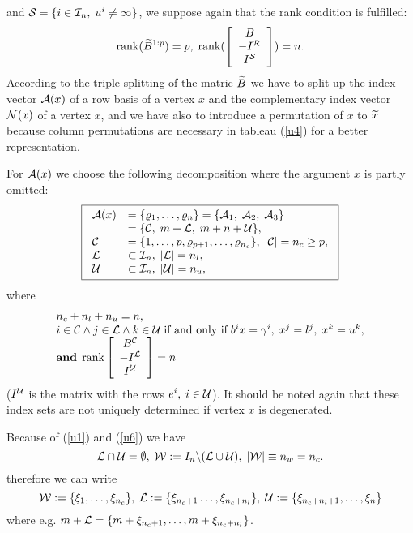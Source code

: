 and ${\cal S} = \{i \in \I_n, \; u^i \neq \infty\}$,
we suppose again that the rank condition is fulfilled:
%
\begin{equation} \label{u5}
\rank (\wi{B}^{1:p}) = p, \; \rank(\ba{[}{c}B\\ - I^{\R} \\ I^{{\cal S}}
\ea{]}) = n.
\end{equation}
%
According to the triple splitting of the matric $\wi{B}$ we have to split up
the index vector $\A(x)$ of a row basis of a vertex $x$ and the complementary
index vector $\N(x)$ of a vertex $x$, and we have also to introduce a
permutation of $x$ to $\wi{x}$ because column permutations are necessary in
tableau (\ref{u4}) for a better representation.
\par
For $\A(x)$ we choose the following decomposition where the argument $x$ is
partly omitted:
%
\begin{equation} \label{u6}
\fbox{$
\ba{.}{ll}
\A(x) &= \{\rho _1, \ldots, \rho _n \} = \{\A_1, \; \A_2, \; \A_3 \}\\
      & = \{\C, \; m + \L , \; m + n + \U \},\\
\C    &= \{1, \ldots,p,\rho _{p+1}, \ldots , \rho _{n_c}\}, \;
      |\C| = n_c \geq p, \\
\L    & \subset \I_n,   \; |\L| = n_l, \\
\U    & \subset \I_n,   \; |\U| = n_u,
\ea{.}
$}
\end{equation}
where
\[
\ba{.}{l}
n_c + n_l + n_u = n,\\
i \in \C \wedge j \in \L \wedge k \in \U  \; \mbox{if and only if} \;
       b^ix = \gamma ^i, \; x^j = l^j, \; x^k = u^k, \\
\mbox{{\bf and}} \; \rank \ba{[}{c} B^{\C}\\ -I^{\L} \\ I^{\U} \ea{]} = n
 \ea{.}
\]
%
($I^{\U}$ is the matrix with the rows $e^i, \; i \in \U$). It should be noted
again that these index sets are not uniquely determined if vertex
$x$ is degenerated.
\par
%
Because of (\ref{u1}) and (\ref{u6}) we have
%
\begin{equation} \label{u7}
 \L \cap \U = \emptyset, \; \W := I_n \backslash (\L \cup \U), \;
|\W| \equiv n_w = n_c.
\end{equation}
therefore we can write
%
\[
\W := \{\xi _1, \ldots, \xi _{n_c}\}, \;
\L := \{\xi _{n_c + 1} \ldots, \xi _{n_c + n_l}\}, \;
\U := \{\xi _{n_c + n_l + 1},\ldots, \xi _n\}
\]
%
where e.g.  $m + \L = \{m + \xi_{n_c + 1}, \ldots, m + \xi _{n_c + n_l}\}$.
